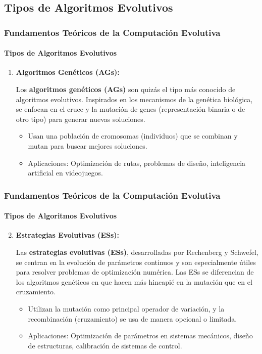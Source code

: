 \documentclass[
	11pt, %
]{beamer}
\begin{document}
\subsection{Tipos de Algoritmos Evolutivos}
\begin{frame}
    \frametitle{Fundamentos Teóricos de la Computación Evolutiva}
    \framesubtitle{Tipos de Algoritmos Evolutivos}
    \begin{enumerate}
        \item \textbf{Algoritmos Genéticos (AGs):}
        
        Los \textbf{algoritmos genéticos (AGs)} son quizás el tipo más conocido de algoritmos evolutivos. Inspirados en los mecanismos de la genética biológica, se enfocan en el cruce y la mutación de genes (representación binaria o de otro tipo) para generar nuevas soluciones.
        
        \begin{itemize}
            \item Usan una población de cromosomas (individuos) que se combinan y mutan para buscar mejores soluciones.
            \item Aplicaciones: Optimización de rutas, problemas de diseño, inteligencia artificial en videojuegos.
        \end{itemize}
    \end{enumerate}
\end{frame}

\begin{frame}
    \frametitle{Fundamentos Teóricos de la Computación Evolutiva}
    \framesubtitle{Tipos de Algoritmos Evolutivos}
    \begin{enumerate}
    \setcounter{enumi}{1}
        \item \textbf{Estrategias Evolutivas (ESs):}
        
        Las \textbf{estrategias evolutivas (ESs)}, desarrolladas por Rechenberg y Schwefel, se centran en la evolución de parámetros continuos y son especialmente útiles para resolver problemas de optimización numérica. Las ESs se diferencian de los algoritmos genéticos en que hacen más hincapié en la mutación que en el cruzamiento.
        
        \begin{itemize}
            \item Utilizan la mutación como principal operador de variación, y la recombinación (cruzamiento) se usa de manera opcional o limitada.
            \item Aplicaciones: Optimización de parámetros en sistemas mecánicos, diseño de estructuras, calibración de sistemas de control.
        \end{itemize}
    \end{enumerate}
\end{frame}
\end{document}
